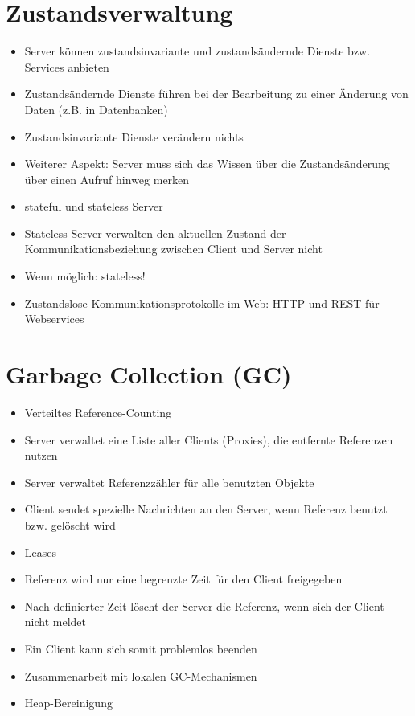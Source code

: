 \documentclass[10pt]{article}
\begin{document}
\section*{Zustandsverwaltung}
\begin{itemize}
  \item Server können zustandsinvariante und zustandsändernde Dienste bzw. Services anbieten
  \item Zustandsändernde Dienste führen bei der Bearbeitung zu einer Änderung von Daten (z.B. in Datenbanken)
  \item Zustandsinvariante Dienste verändern nichts
  \item Weiterer Aspekt: Server muss sich das Wissen über die Zustandsänderung über einen Aufruf hinweg merken
  \item stateful und stateless Server
  \item Stateless Server verwalten den aktuellen Zustand der Kommunikationsbeziehung zwischen Client und Server nicht
  \item Wenn möglich: stateless!
  \item Zustandslose Kommunikationsprotokolle im Web: HTTP und REST für Webservices
\end{itemize}

\section*{Garbage Collection (GC)}
\begin{itemize}
  \item Verteiltes Reference-Counting
  \item Server verwaltet eine Liste aller Clients (Proxies), die entfernte Referenzen nutzen
  \item Server verwaltet Referenzzähler für alle benutzten Objekte
  \item Client sendet spezielle Nachrichten an den Server, wenn Referenz benutzt bzw. gelöscht wird
  \item Leases
  \item Referenz wird nur eine begrenzte Zeit für den Client freigegeben
  \item Nach definierter Zeit löscht der Server die Referenz, wenn sich der Client nicht meldet
  \item Ein Client kann sich somit problemlos beenden
  \item Zusammenarbeit mit lokalen GC-Mechanismen
  \item Heap-Bereinigung
\end{itemize}
\end{document}
